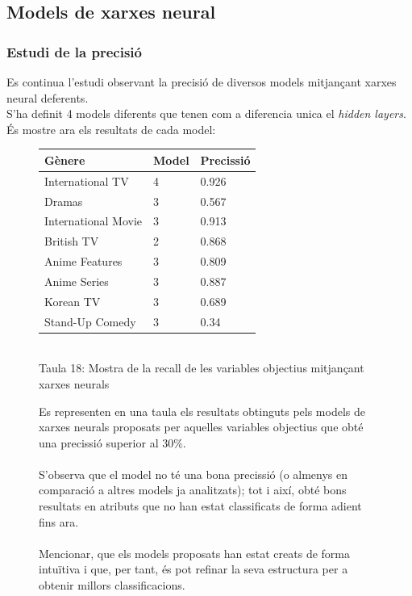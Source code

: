 \documentclass[a4paper, 11pt]{article}
\begin{document}
\subsection{Models de xarxes neural}\label{random}
\subsubsection{Estudi de la precisió}
Es continua l'estudi observant la precisió de diversos models mitjançant xarxes neural deferents.\\
S'ha definit 4 models diferents que tenen com a diferencia unica el \textit{hidden layers}.\\
És mostre ara els resultats de cada model:
\begin{figure}[h] %
\begin{minipage}{7cm} %
\begin{center}
    \begin{tabular}{l|l|l}
        \textbf{Gènere} & \textbf{Model} & \textbf{Precissió}\\\hline\hline
        International TV & 4 & 0.926\\ \hline
        Dramas &  3 &  0.567 \\\hline
        International Movie &  3 & 0.913 \\ \hline
        British TV & 2 & 0.868 \\ \hline
        Anime Features & 3 & 0.809\\ \hline
        Anime Series & 3 & 0.887\\ \hline
        Korean TV & 3 & 0.689\\ \hline
        Stand-Up Comedy & 3 & 0.34 \\
    \end{tabular}
    \label{tab:afins}
    \\
    Taula 18: Mostra de la recall de les variables objectius mitjançant xarxes neurals  \setcounter{table}{18}
\end{center}
\end{minipage} %
\hspace{2em}
\begin{minipage}{7cm} %

Es representen en una taula els resultats obtinguts pels models de xarxes neurals proposats per aquelles variables objectius que obté una precissió superior al $30\%$.\\\\
S'observa que el model no té una bona precissió (o almenys en comparació a altres models ja analitzats); tot i així, obté bons resultats en atributs que no han estat classificats de forma adient fins ara.\\\\
Mencionar, que els models proposats han estat creats de forma intuïtiva i que, per tant, és pot refinar la seva estructura per a obtenir millors classificacions.
\end{minipage} %
\end{figure} %
\end{document}
